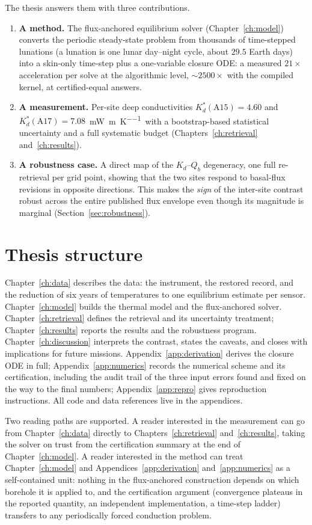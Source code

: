 \documentclass[11pt,a4paper,oneside]{report}
\newcommand{\Kd}{\ensuremath{K_d}}
\newcommand{\Kds}{\ensuremath{K_d^{*}}}
\newcommand{\Qb}{\ensuremath{Q_b}}
\newcommand{\mWmK}{\si{\milli\watt\per\meter\per\kelvin}}
\begin{document}
The thesis answers them with three contributions.
\begin{enumerate}
  \item \textbf{A method.} The flux-anchored equilibrium solver
    (Chapter~\ref{ch:model}) converts the periodic steady-state
    problem from thousands of time-stepped lunations (a lunation is
    one lunar day--night cycle, about $29.5$ Earth days) into a
    skin-only time-step plus a one-variable closure ODE: a measured $21\times$
    acceleration per solve at the algorithmic level, ${\sim}2500\times$
    with the compiled kernel, at certified-equal answers.
  \item \textbf{A measurement.} Per-site deep conductivities
    $\Kds(\mathrm{A15})=4.60$ and $\Kds(\mathrm{A17})=7.08$~\mWmK\
    with a bootstrap-based statistical uncertainty and a full
    systematic budget (Chapters~\ref{ch:retrieval}
    and~\ref{ch:results}).
  \item \textbf{A robustness case.} A direct map of the $\Kd$--$\Qb$
    degeneracy, one full re-retrieval per grid point, showing that the
    two sites respond to basal-flux revisions in opposite directions.
    This makes the \emph{sign} of the inter-site contrast robust
    across the entire published flux envelope even though its
    magnitude is marginal (Section~\ref{sec:robustness}).
\end{enumerate}

\section{Thesis structure}
Chapter~\ref{ch:data} describes the data: the instrument, the restored
record, and the reduction of six years of temperatures to one
equilibrium estimate per sensor. Chapter~\ref{ch:model} builds the
thermal model and the flux-anchored solver.
Chapter~\ref{ch:retrieval} defines the retrieval and its uncertainty
treatment; Chapter~\ref{ch:results} reports the results and the
robustness program. Chapter~\ref{ch:discussion} interprets the
contrast, states the caveats, and closes with implications for future
missions. Appendix~\ref{app:derivation} derives the closure ODE in
full; Appendix~\ref{app:numerics} records the numerical scheme and its
certification, including the audit trail of the three input errors
found and fixed on the way to the final numbers;
Appendix~\ref{app:repro} gives reproduction instructions. All code
and data references live in the appendices.

Two reading paths are supported. A reader interested in the
measurement can go from Chapter~\ref{ch:data} directly to
Chapters~\ref{ch:retrieval} and~\ref{ch:results}, taking the solver
on trust from the certification summary at the end of
Chapter~\ref{ch:model}. A reader interested in the method can treat
Chapter~\ref{ch:model} and Appendices~\ref{app:derivation}
and~\ref{app:numerics} as a self-contained unit: nothing in the
flux-anchored construction depends on which borehole it is applied
to, and the certification argument (convergence plateaus in the
reported quantity, an independent implementation, a time-step ladder)
transfers to any periodically forced conduction problem.
\end{document}
